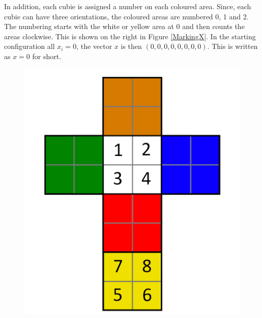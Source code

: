 \documentclass[12pt,a4paper]{article}
\theoremstyle{custom}
\begin{document}
In addition, each cubie is assigned a number on each coloured area. Since, each cubie can have three orientations, the coloured areas are numbered 0, 1 and 2. The numbering starts with the white or yellow area at 0 and then counts the areas clockwise. This is shown on the right in Figure \ref{MarkingX}.
In the starting configuration all $x_i = 0$, the vector $x$ is then $(0, 0, 0, 0, 0, 0, 0, 0)$. This is written as $x=0$ for short.
\begin{figure}[H]
\centering
\includegraphics[scale=0.15]{foldedout_numbers.png} \hspace*{2em}

\end{figure}
\end{document}
